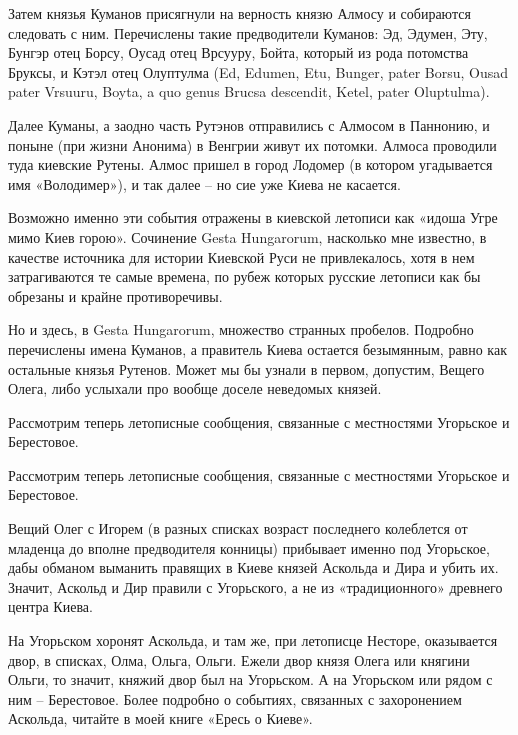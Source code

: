 \documentclass[a5paper,11pt,openany]{article}
\begin{document}
Затем князья Куманов присягнули на верность князю Алмосу и собираются следовать с ним. Перечислены такие предводители Куманов: Эд, Эдумен, Эту, Бунгэр отец Борсу, Оусад отец Врсууру, Бойта, который из рода потомства Бруксы, и Кэтэл отец Олуптулма (Ed, Edumen, Etu, Bunger, pater Borsu, Ousad pater Vrsuuru, Boyta, a quo genus Brucsa descendit, Ketel, pater Oluptulma).

Далее Куманы, а заодно часть Рутэнов отправились с Алмосом в Паннонию, и поныне (при жизни Анонима) в Венгрии живут их потомки. Алмоса проводили туда киевские Рутены. Алмос пришел в город Лодомер (в котором угадывается имя «Володимер»), и так 
далее – но сие уже Киева не касается. 

Возможно именно эти события отражены в киевской летописи как «идоша Угре мимо Киев горою». Сочинение Gesta Hungarorum, насколько мне известно, в качестве источника для истории Киевской Руси не привлекалось, хотя в нем затрагиваются те самые времена, по рубеж которых русские летописи как бы обрезаны и крайне противоречивы.

Но и здесь, в Gesta Hungarorum, множество странных пробелов. Подробно перечислены имена Куманов, а правитель Киева остается безымянным, равно как остальные князья Рутенов. Может мы бы узнали в первом, допустим, Вещего Олега, либо услыхали про вообще доселе неведомых князей.

Рассмотрим теперь летописные сообщения, связанные с местностями Угорьское и Берестовое.


Рассмотрим теперь летописные сообщения, связанные с местностями Угорьское и Берестовое.

Вещий Олег с Игорем (в разных списках возраст последнего колеблется от младенца до вполне предводителя конницы) прибывает именно под Угорьское, дабы обманом выманить правящих в Киеве князей Аскольда и Дира и убить их. Значит, Аскольд и Дир правили с Угорьского, а не из «традиционного» древнего центра Киева.

На Угорьском хоронят Аскольда, и там же, при летописце Несторе, оказывается двор, в списках, Олма, Ольга, Ольги. Ежели двор князя Олега или княгини Ольги, то значит, княжий двор был на Угорьском. А на Угорьском или рядом с ним – Берестовое. Более подробно о событиях, связанных с захоронением Аскольда, читайте в моей книге «Ересь о Киеве»\cite{eres}.
\end{document}
